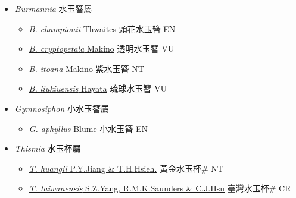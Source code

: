 
  \begin{itemize}
 \item[] \textit{Burmannia} 水玉簪屬
                    
  \begin{itemize}
        \item[] \href{http://www.theplantlist.org/tpl1.1/search?q=Burmannia+championii}{\textit{B. championii} Thwaites}   頭花水玉簪 EN
        \item[] \href{http://www.theplantlist.org/tpl1.1/search?q=Burmannia+cryptopetala}{\textit{B. cryptopetala} Makino}   透明水玉簪 VU
        \item[] \href{http://www.theplantlist.org/tpl1.1/search?q=Burmannia+itoana}{\textit{B. itoana} Makino}   紫水玉簪 NT
        \item[] \href{http://www.theplantlist.org/tpl1.1/search?q=Burmannia+liukiuensis}{\textit{B. liukiuensis} Hayata}   琉球水玉簪 VU
  \end{itemize}
 \item[] \textit{Gymnosiphon} 小水玉簪屬
                    
  \begin{itemize}
        \item[] \href{http://www.theplantlist.org/tpl1.1/search?q=Gymnosiphon+aphyllus}{\textit{G. aphyllus} Blume}   小水玉簪 EN
  \end{itemize}
 \item[] \textit{Thismia} 水玉杯屬
                    
  \begin{itemize}
        \item[] \href{http://www.theplantlist.org/tpl1.1/search?q=Thismia+huangii}{\textit{T. huangii} P.Y.Jiang \& T.H.Hsieh.}   黃金水玉杯\# NT
        \item[] \href{http://www.theplantlist.org/tpl1.1/search?q=Thismia+taiwanensis}{\textit{T. taiwanensis} S.Z.Yang, R.M.K.Saunders \& C.J.Hsu}   臺灣水玉杯\# CR
  \end{itemize}
  \end{itemize}
